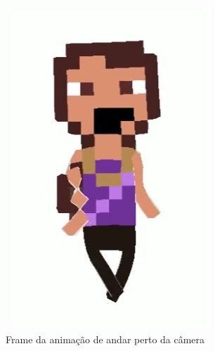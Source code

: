 \begin{figure}[htbp]
\begin{subfigure}{0.2\linewidth}
        \includegraphics[width=1\linewidth]{figs/sketchLab/irma2_frame3.jpg}
        \caption{\small Frame da animação de andar perto da câmera}
        \label{fig:sketchIrma2Frame3}
    \end{subfigure}
    \begin{subfigure}{0.2\linewidth}

\end{subfigure}
\end{figure}
